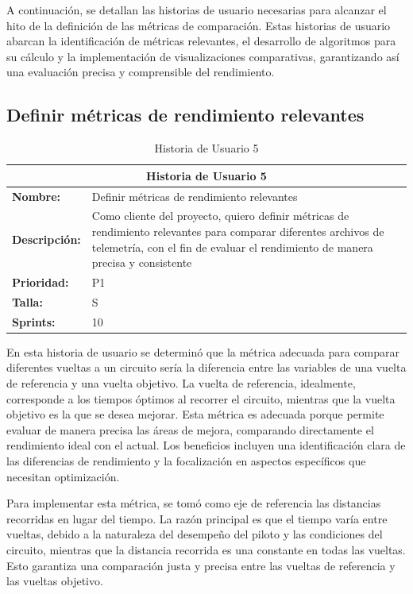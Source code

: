 A continuación, se detallan las historias de usuario necesarias para alcanzar el hito de la definición de las métricas de comparación. Estas historias de usuario abarcan la identificación de métricas relevantes, el desarrollo de algoritmos para su cálculo y la implementación de visualizaciones comparativas, garantizando así una evaluación precisa y comprensible del rendimiento.

\subsection{Definir métricas de rendimiento relevantes}
\begin{table}[H]
\centering
\begin{tabular}{|l|p{10cm}|}
\hline
\multicolumn{2}{|c|}{\textbf{Historia de Usuario 5}} \\ \hline
\textbf{Nombre:} & Definir métricas de rendimiento relevantes \\ \hline
\textbf{Descripción:} & Como cliente del proyecto, quiero definir métricas de rendimiento relevantes para comparar diferentes archivos de telemetría, con el fin de evaluar el rendimiento de manera precisa y consistente \\ \hline
\textbf{Prioridad:} & P1 \\ \hline
\textbf{Talla:} & S \\ \hline
\textbf{Sprints:} & 10 \\ \hline
\end{tabular}
\caption{Historia de Usuario 5}
\label{tab:metricas_rendimiento}
\end{table}

En esta historia de usuario se determinó que la métrica adecuada para comparar diferentes vueltas a un circuito sería la diferencia entre las variables de una vuelta de referencia y una vuelta objetivo. La vuelta de referencia, idealmente, corresponde a los tiempos óptimos al recorrer el circuito, mientras que la vuelta objetivo es la que se desea mejorar. Esta métrica es adecuada porque permite evaluar de manera precisa las áreas de mejora, comparando directamente el rendimiento ideal con el actual. Los beneficios incluyen una identificación clara de las diferencias de rendimiento y la focalización en aspectos específicos que necesitan optimización.

Para implementar esta métrica, se tomó como eje de referencia las distancias recorridas en lugar del tiempo. La razón principal es que el tiempo varía entre vueltas, debido a la naturaleza del desempeño del piloto y las condiciones del circuito, mientras que la distancia recorrida es una constante en todas las vueltas. Esto garantiza una comparación justa y precisa entre las vueltas de referencia y las vueltas objetivo.


